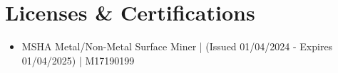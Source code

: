 \documentclass[11pt,a4paper,sans]{moderncv}
\begin{document}
\section{Licenses \& Certifications}
\vspace{-2mm}
{\begin{itemize}[label=\textbullet]
      \item MSHA Metal/Non-Metal Surface Miner | (Issued 01/04/2024 - Expires 01/04/2025) | M17190199 %
  \end{itemize}} 


\end{document}
